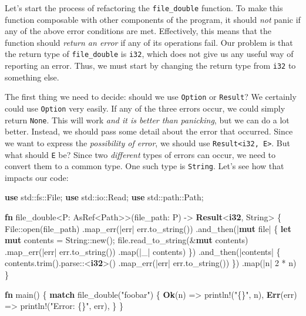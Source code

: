 \documentclass[a4paper,]{book}
\newenvironment{Shaded}{\begin{snugshade}}{\end{snugshade}}
\newcommand{\KeywordTok}[1]{\textcolor[rgb]{0.13,0.29,0.53}{\textbf{{#1}}}}
\newcommand{\DecValTok}[1]{\textcolor[rgb]{0.00,0.00,0.81}{{#1}}}
\newcommand{\StringTok}[1]{\textcolor[rgb]{0.31,0.60,0.02}{{#1}}}
\newcommand{\OtherTok}[1]{\textcolor[rgb]{0.56,0.35,0.01}{{#1}}}
\newcommand{\NormalTok}[1]{{#1}}
\begin{document}
Let's start the process of refactoring the \texttt{file\_double}
function. To make this function composable with other components of the
program, it should \emph{not} panic if any of the above error conditions
are met. Effectively, this means that the function should \emph{return
an error} if any of its operations fail. Our problem is that the return
type of \texttt{file\_double} is \texttt{i32}, which does not give us
any useful way of reporting an error. Thus, we must start by changing
the return type from \texttt{i32} to something else.

The first thing we need to decide: should we use \texttt{Option} or
\texttt{Result}? We certainly could use \texttt{Option} very easily. If
any of the three errors occur, we could simply return \texttt{None}.
This will work \emph{and it is better than panicking}, but we can do a
lot better. Instead, we should pass some detail about the error that
occurred. Since we want to express the \emph{possibility of error}, we
should use \texttt{Result\textless{}i32,\ E\textgreater{}}. But what
should \texttt{E} be? Since two \emph{different} types of errors can
occur, we need to convert them to a common type. One such type is
\texttt{String}. Let's see how that impacts our code:

\begin{Shaded}
\begin{Highlighting}[]
\KeywordTok{use} \NormalTok{std::fs::File;}
\KeywordTok{use} \NormalTok{std::io::Read;}
\KeywordTok{use} \NormalTok{std::path::Path;}

\KeywordTok{fn} \NormalTok{file_double<P: AsRef<Path>>(file_path: P) -> }\KeywordTok{Result}\NormalTok{<}\KeywordTok{i32}\NormalTok{, String> \{}
    \NormalTok{File::open(file_path)}
         \NormalTok{.map_err(|err| err.to_string())}
         \NormalTok{.and_then(|}\KeywordTok{mut} \NormalTok{file| \{}
              \KeywordTok{let} \KeywordTok{mut} \NormalTok{contents = String::new();}
              \NormalTok{file.read_to_string(&}\KeywordTok{mut} \NormalTok{contents)}
                  \NormalTok{.map_err(|err| err.to_string())}
                  \NormalTok{.map(|_| contents)}
         \NormalTok{\})}
         \NormalTok{.and_then(|contents| \{}
              \NormalTok{contents.trim().parse::<}\KeywordTok{i32}\NormalTok{>()}
                      \NormalTok{.map_err(|err| err.to_string())}
         \NormalTok{\})}
         \NormalTok{.map(|n| }\DecValTok{2} \NormalTok{* n)}
\NormalTok{\}}

\KeywordTok{fn} \NormalTok{main() \{}
    \KeywordTok{match} \NormalTok{file_double(}\StringTok{"foobar"}\NormalTok{) \{}
        \KeywordTok{Ok}\NormalTok{(n) => }\OtherTok{println!}\NormalTok{(}\StringTok{"\{\}"}\NormalTok{, n),}
        \KeywordTok{Err}\NormalTok{(err) => }\OtherTok{println!}\NormalTok{(}\StringTok{"Error: \{\}"}\NormalTok{, err),}
    \NormalTok{\}}
\NormalTok{\}}
\end{Highlighting}
\end{Shaded}
\end{document}

